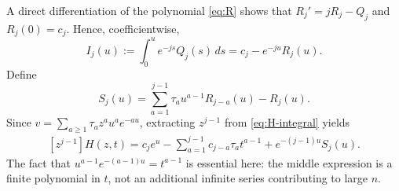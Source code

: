 \documentclass[11pt,letterpaper]{article}
\numberwithin{equation}{section}
\theoremstyle{definition}
\begin{document}
A direct differentiation of the polynomial \eqref{eq:R} shows that
$R_j'=jR_j-Q_j$ and $R_j(0)=c_j$. Hence, coefficientwise,
\begin{equation}\label{eq:I}
 I_j(u):=\int_0^u e^{-js}Q_j(s)\,ds=c_j-e^{-ju}R_j(u).
\end{equation}
Define
\begin{equation}\label{eq:S-convolution}
 S_j(u)=\sum_{a=1}^{j-1}\tau_a u^{a-1}R_{j-a}(u)-R_j(u).
\end{equation}
Since $v=\sum_{a\ge1}\tau_a z^a u^a e^{-au}$, extracting $z^{j-1}$
from \eqref{eq:H-integral} yields
\begin{equation}\label{eq:Hj}
 \begin{split}
 [z^{j-1}]H(z,t)
 =c_j e^u-\sum_{a=1}^{j-1}c_{j-a}\tau_a t^{a-1}
                 +e^{-(j-1)u}S_j(u).
 \end{split}
\end{equation}
The fact that $u^{a-1}e^{-(a-1)u}=t^{a-1}$ is essential here: the middle
expression is a finite polynomial in $t$, not an additional infinite
series contributing to large $n$.
\end{document}
